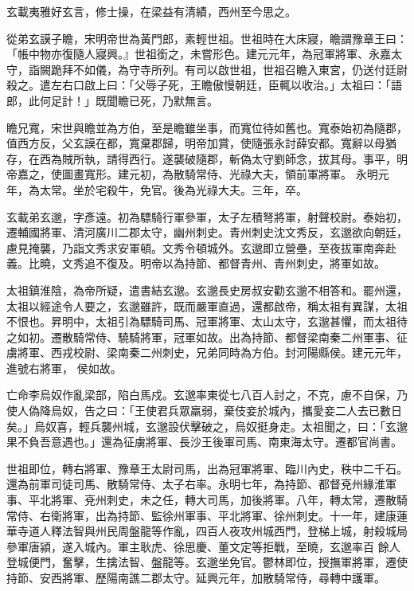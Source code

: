 \begin{pinyinscope}
 玄載夷雅好玄言，修士操，在梁益有清績，西州至今思之。



 從弟玄謨子瞻，宋明帝世為黃門郎，素輕世祖。世祖時在大床寢，瞻謂豫章王曰：「帳中物亦復隨人寢興。』世祖銜之，未嘗形色。建元元年，為冠軍將軍、永嘉太守，詣闕跪拜不如儀，為守寺所列。有司以啟世祖，世祖召瞻入東宮，仍送付廷尉殺之。遣左右口啟上曰：「父辱子死，王瞻傲慢朝廷，臣輒以收治。」太祖曰：「語郎，此何足計！」既聞瞻已死，乃默無言。



 瞻兄寬，宋世與瞻並為方伯，至是瞻雖坐事，而寬位待如舊也。寬泰始初為隨郡，值西方反，父玄謨在都，寬棄郡歸，明帝加賞，使隨張永討薛安都。寬辭以母猶存，在西為賊所執，請得西行。遂襲破隨郡，斬偽太守劉師念，拔其母。事平，明帝嘉之，使圖畫寬形。建元初，為散騎常侍、光祿大夫，領前軍將軍。
 永明元年，為太常。坐於宅殺牛，免官。後為光祿大夫。三年，卒。



 玄載弟玄邈，字彥遠。初為驃騎行軍參軍，太子左積弩將軍，射聲校尉。泰始初，遷輔國將軍、清河廣川二郡太守，幽州刺史。青州刺史沈文秀反，玄邈欲向朝廷，慮見掩襲，乃詣文秀求安軍頓。文秀令頓城外。玄邈即立營壘，至夜拔軍南奔赴義。比曉，文秀追不復及。明帝以為持節、都督青州、青州刺史，將軍如故。



 太祖鎮淮陰，為帝所疑，遣書結玄邈。玄邈長史房叔安勸玄邈不相答和。罷州還，太祖以經途令人要之，玄邈雖許，既而嚴軍直過，還都啟帝，稱太祖有異謀，太祖不恨也。昇明中，太祖引為驃騎司馬、冠軍將軍、太山太守，玄邈甚懼，而太祖待之如初。遷散騎常侍、驍騎將軍，冠軍如故。出為持節、都督梁南秦二州軍事、征虜將軍、西戎校尉、梁南秦二州刺史，兄弟同時為方伯。封河陽縣侯。建元元年，進號右將軍，
 侯如故。



 亡命李烏奴作亂梁部，陷白馬戍。玄邈率東從七八百人討之，不克，慮不自保，乃使人偽降烏奴，告之曰：「王使君兵眾羸弱，棄伎妾於城內，攜愛妾二人去已數日矣。」烏奴喜，輕兵襲州城，玄邈設伏擊破之，烏奴挺身走。太祖聞之，曰：「玄邈果不負吾意遇也。」還為征虜將軍、長沙王後軍司馬、南東海太守。遷都官尚書。



 世祖即位，轉右將軍、豫章王太尉司馬，出為冠軍將軍、臨川內史，秩中二千石。還為前軍司徒司馬、散騎常侍、太子右率。永明七年，為持節、都督兗州緣淮軍事、平北將軍、兗州刺史，未之任，轉大司馬，加後將軍。八年，轉太常，遷散騎常侍、右衛將軍，出為持節、監徐州軍事、平北將軍、徐州刺史。十一年，建康蓮華寺道人釋法智與州民周盤龍等作亂，四百人夜攻州城西門，登梯上城，射殺城局參軍唐潁，遂入城內。軍主耿虎、徐思慶、董文定等拒戰，至曉，玄邈率百
 餘人登城便門，奮擊，生擒法智、盤龍等。玄邈坐免官。鬱林即位，授撫軍將軍，遷使持節、安西將軍、歷陽南譙二郡太守。延興元年，加散騎常侍，尋轉中護軍。




\end{pinyinscope}
